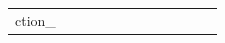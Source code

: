 \documentclass[conference]{IEEEtran}
\begin{document}
\begin{figure}
\begin{center}
\begin{tabular}{| x{1.11cm} | x{.75cm} | x{.75cm} || x{1.11cm} | x{.75cm} | x{.75cm} || x{1.11cm} | x{.75cm} | x{.75cm} || x{1.11cm} | x{.75cm} | x{.75cm} |}
ction_
\end{tabular}
\end{center}
\end{figure}
\end{document}
